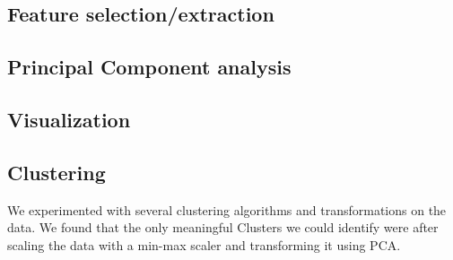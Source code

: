 \subsection{Feature selection/extraction}%
\label{sub:feature-selection}

\subsection{Principal Component analysis}%
\label{sub:pca}

\subsection{Visualization}%
\label{sub:visualization}

\subsection{Clustering}%
\label{sub:clustering}

We experimented with several clustering algorithms and transformations on the data. We
found that the only meaningful Clusters we could identify were after scaling the data with
a min-max scaler and transforming it using PCA.

